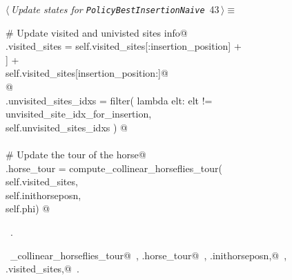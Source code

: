 \documentclass[11.5pt]{report}
\begin{document}
\vspace{-0.8cm}\newchunk 
\begin{flushleft} \small\label{scrap52}\raggedright\small
{} $\langle\,${\itshape Update states for \texttt{PolicyBestInsertionNaive}}\nobreak\ {\footnotesize {43}}$\,\rangle\equiv$
\vspace{-1ex}
\begin{list}{}{} \item
\mbox{}\verb@# Update visited and univisted sites info@\\
\mbox{}\verb@self.visited_sites = self.visited_sites[:insertion_position]      +\@\\
\mbox{}\verb@                     [self.sites[unvisited_site_idx_for_insertion]] +\@\\
\mbox{}\verb@                     self.visited_sites[insertion_position:]@\\
\mbox{}\verb@  @\\
\mbox{}\verb@self.unvisited_sites_idxs = filter( lambda elt: elt != unvisited_site_idx_for_insertion, \@\\
\mbox{}\verb@                                    self.unvisited_sites_idxs ) @\\
\mbox{}\verb@@\\
\mbox{}\verb@# Update the tour of the horse@\\
\mbox{}\verb@self.horse_tour = compute_collinear_horseflies_tour(\@\\
\mbox{}\verb@                           self.visited_sites,         \@\\
\mbox{}\verb@                           self.inithorseposn, \@\\
\mbox{}\verb@                           self.phi) @\\
\mbox{}\verb@@{\NWsep}
\end{list}
\vspace{-1.5ex}
\footnotesize
\begin{list}{}{\setlength{\itemsep}{-\parsep}\setlength{\itemindent}{-\leftmargin}}
\item \NWtxtMacroRefIn\ .
\item \NWtxtIdentsUsed\nobreak\  \verb@compute_collinear_horseflies_tour@\nobreak\ , \verb@self.horse_tour@\nobreak\ , \verb@self.inithorseposn,@\nobreak\ , \verb@self.visited_sites,@\nobreak\ .
\item{}
\end{list}
\vspace{4ex}
\end{flushleft}
\newpage
\end{document}
